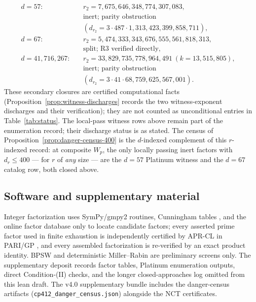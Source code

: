 \documentclass[11pt]{amsart}
\theoremstyle{plain}
\theoremstyle{definition}
\theoremstyle{remark}
\numberwithin{equation}{section}
\begin{document}
\[
  \begin{aligned}
  d=57:&\quad r_2=7{,}675{,}646{,}348{,}774{,}307{,}083,\\
       &\quad \text{inert; parity obstruction}\\
       &\quad (d_{r_2}=3\cdot487\cdot1{,}313{,}423{,}399{,}858{,}711),\\
  d=67:&\quad r_2=5{,}474{,}333{,}343{,}676{,}555{,}561{,}818{,}313,\\
       &\quad \text{split; R3 verified directly},\\
  d=41{,}716{,}267:&\quad r_2=33{,}829{,}735{,}778{,}964{,}491\ (k=13{,}515{,}805),\\
       &\quad \text{inert; parity obstruction}\\
       &\quad (d_{r_2}=3\cdot41\cdot68{,}759{,}625{,}567{,}001).
  \end{aligned}
\]
These secondary closures are certified computational facts (Proposition~\ref{prop:witness-discharges} records the two witness-exponent discharges and their verification); they are not counted as unconditional entries in Table~\ref{tab:status}. The local-pass witness rows above remain part of the enumeration record; their discharge status is as stated. The census of Proposition~\ref{prop:danger-census-400} is the $d$-indexed complement of this $r$-indexed record: at composite $W_p$, the only locally passing inert factors with $d_r \leq 400$ --- for $r$ of \emph{any} size --- are the $d = 57$ Platinum witness and the $d = 67$ catalog row, both closed above.

\subsection{Software and supplementary material}\label{sec:toolchain}

Integer factorization uses SymPy/gmpy2 routines, Cunningham tables \cite{ref:Cunningham}, and the online factor database \cite{ref:FactorDB} only to locate candidate factors; every asserted prime factor used in finite exhaustion is independently certified by APR-CL in PARI/GP \cite{ref:CohenLenstra}, and every assembled factorization is re-verified by an exact product identity. BPSW and deterministic Miller--Rabin are preliminary screens only. The supplementary deposit records factor tables, Platinum enumeration outputs, direct Condition-(II) checks, and the longer closed-approaches log omitted from this lean draft. The v4.0 supplementary bundle includes the danger-census artifacts (\texttt{cp412\_danger\_census.json}) alongside the NCT certificates.
\end{document}
